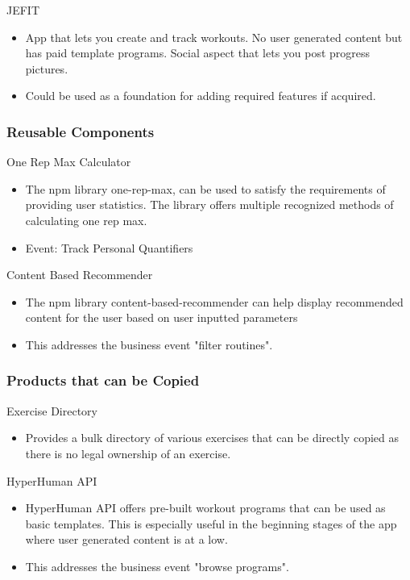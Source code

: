 \documentclass[12pt]{article}
\begin{document}
				\noindent JEFIT
				\begin{itemize}
				\item App that lets you create and track workouts. No user generated content but has paid template programs. Social aspect that lets you post progress pictures. 
				\item Could be used as a foundation for adding required features if acquired.
				\end{itemize}
		
			\subsubsection{Reusable Components}
		
				\noindent One Rep Max Calculator
				\begin{itemize}
				\item The npm library one-rep-max, can be used to satisfy the requirements of providing user statistics. The library offers multiple recognized methods of calculating one rep max. 
				\item Event: Track Personal Quantifiers 
				\end{itemize}
				
				\noindent Content Based Recommender 
				\begin{itemize}
				\item The npm library content-based-recommender can help display recommended content for the user based on user inputted parameters 
				\item This addresses the business event "filter routines". 
				\end{itemize}
		
			\subsubsection{Products that can be Copied}
		
				\noindent Exercise Directory
				\begin{itemize}
				\item Provides a bulk directory of various exercises that can be directly copied as there is no legal ownership of an exercise.
				\end{itemize}
		
				\noindent HyperHuman API 
				\begin{itemize}
				\item HyperHuman API offers pre-built workout programs that can be used as basic templates. This is especially useful in the beginning stages of the app where user generated content is at a low. 
				\item This addresses the business event "browse programs". 
				\end{itemize}
		
\end{document}
